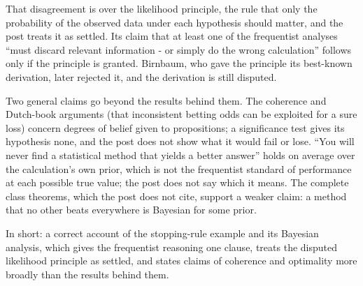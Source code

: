 \begin{afterword}
That disagreement is over the likelihood principle, the rule that only the probability of the observed data under each hypothesis should matter, and the post treats it as settled. Its claim that at least one of the frequentist analyses ``must discard relevant information - or simply do the wrong calculation'' follows only if the principle is granted. Birnbaum, who gave the principle its best-known derivation, later rejected it, and the derivation is still disputed.

Two general claims go beyond the results behind them. The coherence and Dutch-book arguments (that inconsistent betting odds can be exploited for a sure loss) concern degrees of belief given to propositions; a significance test gives its hypothesis none, and the post does not show what it would fail or lose. ``You will never find a statistical method that yields a better answer'' holds on average over the calculation's own prior, which is not the frequentist standard of performance at each possible true value; the post does not say which it means. The complete class theorems, which the post does not cite, support a weaker claim: a method that no other beats everywhere is Bayesian for some prior.

In short: a correct account of the stopping-rule example and its Bayesian analysis, which gives the frequentist reasoning one clause, treats the disputed likelihood principle as settled, and states claims of coherence and optimality more broadly than the results behind them.
\end{afterword}
